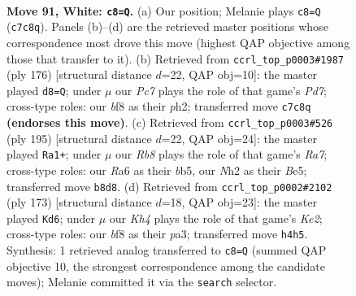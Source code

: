 \documentclass[11pt]{article}
\begin{document}
\clearpage

\begin{figure}[p]\centering
\begin{subfigure}{0.46\textwidth}\centering
\resizebox{\linewidth}{!}{%
\newchessgame
\chessboard[
  setfen={1R3b2/2P2r1k/R7/8/7K/8/7N/8 w - - 1 91},
  showmover=false,
  pgfstyle=straightmove, color=movearrow, markmove={c7-c8}
]}
\caption{}
\end{subfigure}\hfill
\begin{subfigure}{0.46\textwidth}\centering
\resizebox{\linewidth}{!}{%
\newchessgame
\chessboard[
  setfen={8/2KP4/8/8/3r2k1/8/7p/4R3 w - - 12 89},
  showmover=false,
  pgfstyle=straightmove, color=movearrow, markmove={d7-d8}
]}
\caption{}
\end{subfigure}
\\[4pt]
\begin{subfigure}{0.46\textwidth}\centering
\resizebox{\linewidth}{!}{%
\newchessgame
\chessboard[
  setfen={8/4k2p/8/1B2b3/P6R/8/r7/7K b - - 14 98},
  showmover=false,
  pgfstyle=straightmove, color=movearrow, markmove={a2-a1}
]}
\caption{}
\end{subfigure}\hfill
\begin{subfigure}{0.46\textwidth}\centering
\resizebox{\linewidth}{!}{%
\newchessgame
\chessboard[
  setfen={8/4k3/8/R4K2/p7/Pr6/8/8 b - - 17 87},
  showmover=false,
  pgfstyle=straightmove, color=movearrow, markmove={e7-d6}
]}
\caption{}
\end{subfigure}
\caption{\textbf{Move 91, White: \texttt{c8=Q}.} (a) Our position; Melanie plays \texttt{c8=Q} (\texttt{c7c8q}). Panels (b)--(d) are the retrieved master positions whose correspondence most drove this move (highest QAP objective among those that transfer to it). (b) Retrieved from \texttt{ccrl\_top\_p0003\#1987} (ply 176) [structural distance $d$=22, QAP obj=10]: the master played \texttt{d8=Q}; under $\mu$ our \emph{Pc7} plays the role of that game's \emph{Pd7}; cross-type roles: our \emph{b}f8 as their \emph{p}h2; transferred move \texttt{c7c8q} \textbf{(endorses this move)}. (c) Retrieved from \texttt{ccrl\_top\_p0003\#526} (ply 195) [structural distance $d$=22, QAP obj=24]: the master played \texttt{Ra1+}; under $\mu$ our \emph{Rb8} plays the role of that game's \emph{Ra7}; cross-type roles: our \emph{R}a6 as their \emph{b}b5, our \emph{N}h2 as their \emph{B}e5; transferred move \texttt{b8d8}. (d) Retrieved from \texttt{ccrl\_top\_p0002\#2102} (ply 173) [structural distance $d$=18, QAP obj=23]: the master played \texttt{Kd6}; under $\mu$ our \emph{Kh4} plays the role of that game's \emph{Ke2}; cross-type roles: our \emph{b}f8 as their \emph{p}a3; transferred move \texttt{h4h5}. Synthesis: 1 retrieved analog transferred to \texttt{c8=Q} (summed QAP objective 10, the strongest correspondence among the candidate moves); Melanie committed it via the \texttt{search} selector.}
\label{fig:thought-m180}
\end{figure}
\end{document}
